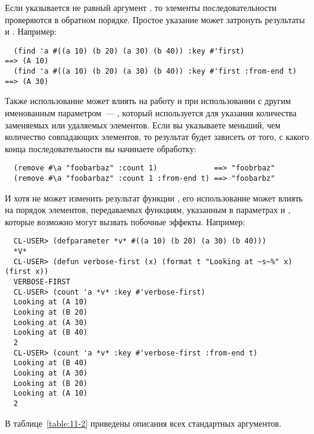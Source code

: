 Если указывается не равный  аргумент , то элементы
последовательности проверяются в обратном порядке.  Простое указание 
может затронуть результаты  и .  Например:

\begin{verbatim}
  (find 'a #((a 10) (b 20) (a 30) (b 40)) :key #'first)             ==> (A 10)
  (find 'a #((a 10) (b 20) (a 30) (b 40)) :key #'first :from-end t) ==> (A 30)
\end{verbatim}

Также использование  может влиять на работу  и
 при использовании с другим именованным параметром~--- ,
который используется для указания количества заменяемых или удаляемых элементов.  Если вы
указываете  меньший, чем количество совпадающих элементов, то результат будет
зависеть от того, с какого конца последовательности вы начинаете обработку:

\begin{verbatim}
  (remove #\a "foobarbaz" :count 1)             ==> "foobrbaz"
  (remove #\a "foobarbaz" :count 1 :from-end t) ==> "foobarbz"
\end{verbatim}

И хотя  не может изменить результат функции , его
использование может влиять на порядок элементов, передаваемых функциям, указанным в
параметрах  и , которые возможно могут вызвать побочные эффекты.
Например:

\begin{verbatim}
  CL-USER> (defparameter *v* #((a 10) (b 20) (a 30) (b 40)))
  *V*
  CL-USER> (defun verbose-first (x) (format t "Looking at ~s~%" x) (first x))
  VERBOSE-FIRST
  CL-USER> (count 'a *v* :key #'verbose-first)
  Looking at (A 10)
  Looking at (B 20)
  Looking at (A 30)
  Looking at (B 40)
  2
  CL-USER> (count 'a *v* :key #'verbose-first :from-end t)
  Looking at (B 40)
  Looking at (A 30)
  Looking at (B 20)
  Looking at (A 10)
  2
\end{verbatim}

В таблице~\ref{table:11-2} приведены описания всех стандартных аргументов.

